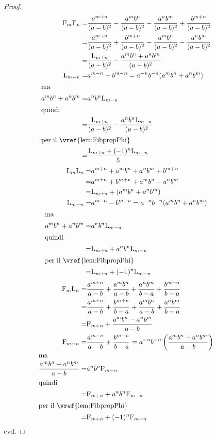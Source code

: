 \begin{proof}
\begin{align*}
	\Fib{m}\Fib{n}=&{}\dfrac{a^{m+n}}{(a-b)^2}-\dfrac{a^mb^n}{(a-b)^2}-\dfrac{a^nb^m}{(a-b)^2}+\dfrac{b^{m+n}}{(a-b)^2}\\
	=&{}\dfrac{a^{m+n}}{(a-b)^2}+\dfrac{b^{m+n}}{(a-b)^2}-\dfrac{a^mb^n}{(a-b)^2}-\dfrac{a^nb^m}{(a-b)^2}\\
	=&{}\dfrac{\Luc{m+n}}{(a-b)^2}-\dfrac{a^mb^n+a^nb^m}{(a-b)^2}\\
	\Luc{m-n}=&{}a^{m-n}-b^{m-n}=a^{-n}b^{-n}(a^mb^n+a^nb^m)\\
	\intertext{ma}
	a^mb^n+a^nb^m=&{}a^{n}b^{n}\Luc{m-n}\\
	\intertext{quindi}
	=&{}\dfrac{\Luc{m+n}}{(a-b)^2}-\dfrac{a^{n}b^{n}\Luc{m-n}}{(a-b)^2}\\
	\intertext{per il~\vref{lem:FibpropPhi}}
	=&{}\dfrac{\Luc{m+n}+(-1)^{n}\Luc{m-n}}{5}
\end{align*}
\begin{align*}
	\Luc{m}\Luc{n}=&{}a^{m+n}+a^mb^n+a^nb^m+b^{m+n}\\
	=&{}a^{m+n}+b^{m+n}+a^mb^n+a^nb^m\\
	=&{}\Luc{m+n}+(a^mb^n+a^nb^m)\\
	\Luc{m-n}=&{}a^{m-n}-b^{m-n}=a^{-n}b^{-n}(a^mb^n+a^nb^m)\\
	\intertext{ma}
	a^mb^n+a^nb^m=&{}a^{n}b^{n}\Luc{m-n}\\
	\intertext{quindi}
	=&{}\Luc{m+n}+a^{n}b^{n}\Luc{m-n}\\
	\intertext{per il~\vref{lem:FibpropPhi}}
	=&{}\Luc{m+n}+(-1)^{n}\Luc{m-n}
\end{align*}
\begin{align*}
	\Fib{m}\Luc{n}=&{}\dfrac{a^{m+n}}{a-b}+\dfrac{a^mb^n}{a-b}+\dfrac{a^nb^m}{b-a}+\dfrac{b^{m+n}}{b-a}\\
	=&{}\dfrac{a^{m+n}}{a-b}+\dfrac{b^{m+n}}{b-a}+\dfrac{a^mb^n}{a-b}+\dfrac{a^nb^m}{b-a}\\
	=&{}\Fib{m+n}+\dfrac{a^mb^n-a^nb^m}{a-b}\\
	\Fib{m-n}=&{}\dfrac{a^{m-n}}{a-b}+\dfrac{b^{m-n}}{b-a}=a^{-n}b^{-n}\left(\dfrac{a^mb^n+a^nb^m}{a-b}\right)\\
	\intertext{ma}
	\dfrac{a^mb^n+a^nb^m}{a-b}=&{}a^{n}b^{n}\Fib{m-n}\\
	\intertext{quindi}
	=&{}\Fib{m+n}+a^{n}b^{n}\Fib{m-n}\\
	\intertext{per il~\vref{lem:FibpropPhi}}
	=&{}\Fib{m+n}+(-1)^{n}\Fib{m-n}
\end{align*}
cvd.
\end{proof}
